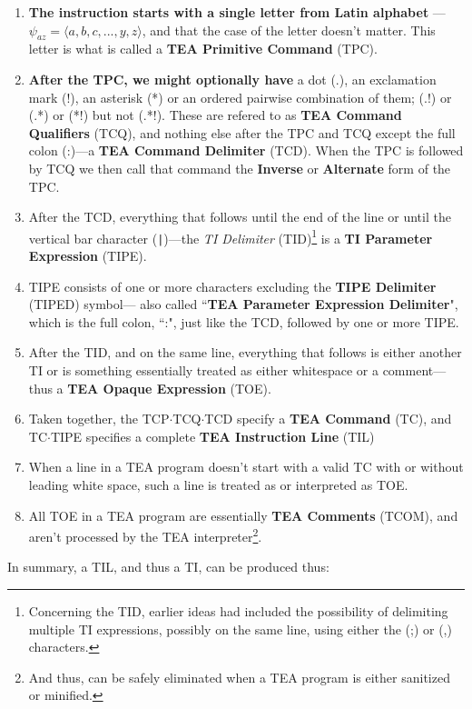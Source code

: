 \documentclass[a4paper, 18pt]{book} %
\begin{document}
\begin{enumerate}
\item \textbf{The instruction starts with a single letter from Latin alphabet} --- $\psi_{az} = \langle a, b, c, ..., y, z \rangle$, and that the case of the letter doesn't matter. This letter is what is called a \textbf{TEA Primitive Command} (TPC).
\item \textbf{After the TPC, we might optionally have} a dot (.), an exclamation mark (!), an asterisk (*) or an ordered pairwise combination of them; (.!) or (.*) or (*!) but not (.*!). These are refered to as \textbf{TEA Command Qualifiers} (TCQ), and nothing else after the TPC and TCQ except the full colon (:)---a \textbf{TEA Command Delimiter} (TCD). When the TPC is followed by TCQ we then call that command the \textbf{Inverse} or \textbf{Alternate} form of the TPC.
\item After the TCD, everything that follows until the end of the line or until the vertical bar character (\verb!|!)---the \textit{TI Delimiter} (TID)\footnote{Concerning the TID, earlier ideas had included the possibility of delimiting multiple TI expressions, possibly on the same line, using either the (;) or (,) characters.} is a \textbf{TI Parameter Expression} (TIPE).
\item TIPE consists of one or more characters excluding the \textbf{TIPE Delimiter} (TIPED) symbol--- also called ``\textbf{TEA Parameter Expression Delimiter}", which is the full colon, ``:", just like the TCD, followed by one or more TIPE.
\item After the TID, and on the same line, everything that follows is either another TI or is something essentially treated as either whitespace or a comment---thus a \textbf{TEA Opaque Expression} (TOE).
\item Taken together, the TCP$\cdot$TCQ$\cdot$TCD specify a \textbf{TEA Command} (TC), and TC$\cdot$TIPE specifies a complete \textbf{TEA Instruction Line} (TIL)
\item When a line in a TEA program doesn't start with a valid TC with or without leading white space, such a line is treated as or interpreted as TOE.
\item All TOE in a TEA program are essentially \textbf{TEA Comments} (TCOM), and aren't processed by the TEA interpreter\footnote{And thus, can be safely eliminated when a TEA program is either sanitized or minified.}.
\end{enumerate}

In summary, a TIL, and thus a TI, can be produced thus:
\end{document}
